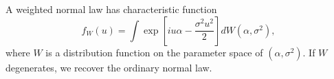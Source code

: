 A weighted normal law has characteristic function
$$f_W(u) = \int \exp\left[ iu\alpha - \frac{\sigma^2 u^2}{2} \right] dW(\alpha, \sigma^2),$$
where $W$ is a distribution function on the parameter space of $(\alpha, \sigma^2)$. If $W$ degenerates, we recover the ordinary normal law.
